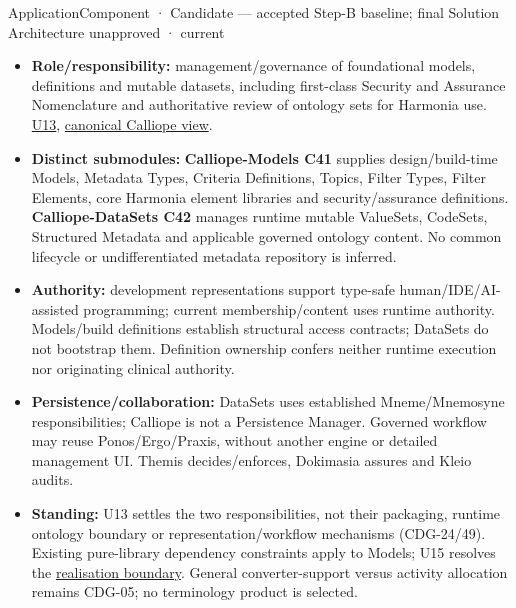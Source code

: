 \label{element:466ad8f75a954c0581b5bba090443849}
{\small ApplicationComponent · Candidate — accepted Step-B baseline; final Solution Architecture unapproved · current}\par

\begin{itemize}


\item \textbf{Role/responsibility:} management/governance of foundational models, definitions
  and mutable datasets, including first-class Security and Assurance Nomenclature
  and authoritative review of ontology sets for Harmonia use. \href{\detokenize{../../../../../docs/markdown/05-information-systems-architecture/sources.md#u13}}{U13},
  \href{\detokenize{../../../../../docs/markdown/05-information-systems-architecture/calliope-models-and-datasets.md}}{canonical Calliope view}.

\item \textbf{Distinct submodules:} \textbf{Calliope-Models C41} supplies design/build-time
  Models, Metadata Types, Criteria Definitions, Topics, Filter Types, Filter Elements,
  core Harmonia element libraries and security/assurance definitions.
  \textbf{Calliope-DataSets C42} manages runtime mutable ValueSets, CodeSets, Structured
  Metadata and applicable governed ontology content. No common lifecycle or
  undifferentiated metadata repository is inferred.

\item \textbf{Authority:} development representations support type-safe human/IDE/AI-assisted
  programming; current membership/content uses runtime authority. Models/build
  definitions establish structural access contracts; DataSets do not bootstrap them.
  Definition ownership confers neither runtime execution nor originating clinical authority.

\item \textbf{Persistence/collaboration:} DataSets uses established Mneme/Mnemosyne
  responsibilities; Calliope is not a Persistence Manager. Governed workflow may
  reuse Ponos/Ergo/Praxis, without another engine or detailed management UI.
  Themis decides/enforces, Dokimasia assures and Kleio audits.

\item \textbf{Standing:} U13 settles the two responsibilities, not their packaging, runtime
  ontology boundary or representation/workflow mechanisms (CDG-24/49). Existing
  pure-library dependency constraints apply to Models; U15 resolves the
  \href{\detokenize{../../../../../docs/markdown/05-information-systems-architecture/calliope-models-and-datasets.md#calliope-realisation}}{realisation boundary}.
  General converter-support
  versus activity allocation remains CDG-05; no terminology product is selected.

\end{itemize}






